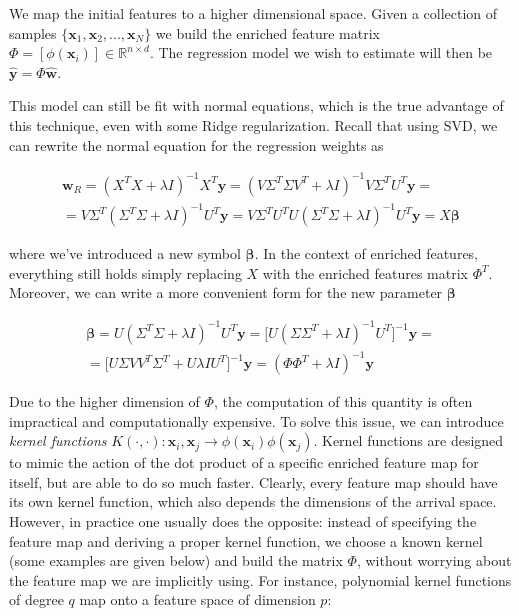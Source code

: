 \documentclass{article}
\numberwithin{equation}{subsection}
\begin{document}
We map the initial features to a higher dimensional space. Given a collection of samples $\{\textbf{x}_1,\textbf{x}_2,...,\textbf{x}_N\}$ we build the enriched feature matrix $\Phi = [\phi(\textbf{x}_i)] \in \mathbb{R}^{n \times d}$. The regression model we wish to estimate will then be $\hat{\textbf{y}} = \Phi \hat{\textbf{w}}$. 

This model can still be fit with normal equations, which is the true advantage of this technique, even with some Ridge regularization. Recall that using SVD, we can rewrite the normal equation for the regression weights as

\begin{gather*}
    \textbf{w}_R = (X^TX+\lambda I)^{-1}X^T \textbf{y} = (V \Sigma^T \Sigma V^T + \lambda I)^{-1} V \Sigma^T U^T \textbf{y} = \\
    = V \Sigma^T (\Sigma^T \Sigma + \lambda I)^{-1} U^T \textbf{y} = V \Sigma^T U^T U (\Sigma^T \Sigma + \lambda I)^{-1} U^T \textbf{y} = X \boldsymbol{\beta}
\end{gather*}

where we've introduced a new symbol $\boldsymbol{\beta}$. In the context of enriched features, everything still holds simply replacing $X$ with the enriched features matrix $\Phi^T$. Moreover, we can write a more convenient form for the new parameter $\boldsymbol{\beta}$

\begin{gather*}
    \boldsymbol{\beta} = U(\Sigma^T \Sigma + \lambda I)^{-1} U^T \textbf{y} = \big[ U (\Sigma \Sigma^T + \lambda I)^{-1} U^T\big]^{-1} \textbf{y} = \\
    = \big[ U \Sigma V V^T \Sigma^T + U \lambda I U^T\big]^{-1} \textbf{y} = (\Phi \Phi^T + \lambda I)^{-1} \textbf{y}
\end{gather*}

Due to the higher dimension of $\Phi$, the computation of this quantity is often impractical and computationally expensive. To solve this issue, we can introduce \textit{kernel functions} $K(\cdot,\cdot) : \textbf{x}_i,\textbf{x}_j \to \phi(\textbf{x}_i)\phi(\textbf{x}_j)$. Kernel functions are designed to mimic the action of the dot product of a specific enriched feature map for itself, but are able to do so much faster. Clearly, every feature map should have its own kernel function, which also depends the dimensions of the arrival space. However, in practice one usually does the opposite: instead of specifying the feature map and deriving a proper kernel function, we choose a known kernel (some examples are given below) and build the matrix $\Phi$, without worrying about the feature map we are implicitly using. For instance, polynomial kernel functions of degree $q$ map onto a feature space of dimension $p$:
\end{document}
